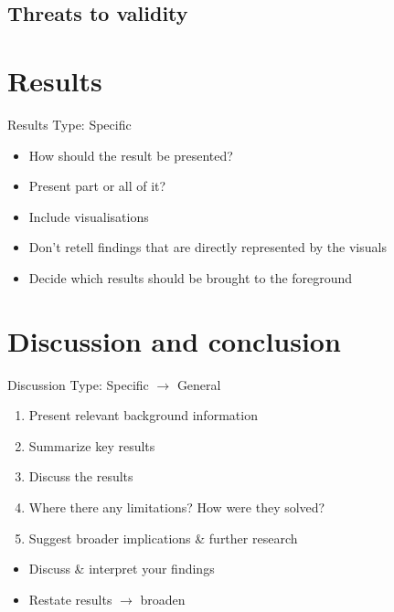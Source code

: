 \documentclass[a4paper,11pt]{article}
\newcounter{counterTODO}\setcounter{counterTODO}{1}
\newcounter{counterTODOMaybe}\setcounter{counterTODOMaybe}{1}
\newcommand\TODO[2][]{%
  \ifshowTodo{%
    \def\varTODOtext{\textcolor{purple}{\texttt{<}\textbf{TODO}\#\arabic{counterTODO}\texttt{: #2>}}}
    \def\varTODOContentLine{\textcolor{purple}{#2}}
    \ifthenelse{\isempty{#1}}%
      {%
        \addcontentsline{tocTODO}{section}{\vspace{-0.3cm}\varTODOContentLine}%
        \varTODOtext\\%
      }%
      {%
        \addcontentsline{tocTODO}{section}{\vspace{-0.3cm}\sout{\varTODOContentLine}}%
      }%
      \stepcounter{counterTODO}%
  }\fi%
}
\newcommand\TODOMaybe[1]{%
  \ifshowTodo{%
    \textcolor{orange}{%
      \texttt{<}\textbf{TODOMaybe}\#\arabic{counterTODOMaybe}\texttt{: #1?>}%
    }\\%
    \stepcounter{counterTODOMaybe}
  }\fi%
}
\newif\ifshowTodo
\begin{document}
  \subsection{Threats to validity}
    \TODO[]{Finish Threats to validity}

\section{Results}
  \begin{notes}{Results}
    Type: Specific
    \begin{itemize}
      \item{How should the result be presented?}
      \item{Present part or all of it?}
      \item{Include visualisations}
      \item{Don't retell findings that are directly represented by the visuals}
      \item{Decide which results should be brought to the foreground}
    \end{itemize}
  \end{notes}

  \TODO[]{Finish Results }
  \TODOMaybe{Flesh out more sub-sections}

\section{Discussion and conclusion}

  \begin{notes}{Discussion}
    Type: Specific $\rightarrow$ General
    \begin{enumerate}
      \item{Present relevant background information}
      \item{Summarize key results}
      \item{Discuss the results}
      \item{Where there any limitations? How were they solved?}
      \item{Suggest broader implications \& further research}
    \end{enumerate}
    \begin{itemize}
      \item{Discuss \& interpret your findings}
      \item{Restate results $\rightarrow$ broaden}
    \end{itemize}
  \end{notes}
\end{document}
